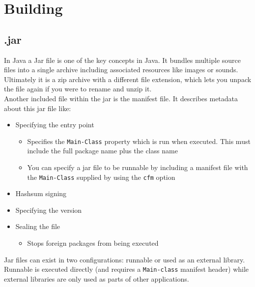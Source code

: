 \documentclass{article}
\begin{document}
	\section{Building}
	\subsection{.jar}
	In Java a Jar file is one of the key concepts in Java. It bundles multiple source files into a single archive including associated resources like images or sounds. Ultimately it is a zip archive with a different file extension, which lets you unpack the file again if you were to rename and unzip it. \\
	Another included file within the jar is the manifest file. It describes metadata about this jar file like:
	\begin{itemize}
		\item{Specifying the entry point}
		\begin{itemize}
			\item{Specifies the \texttt{Main-Class} property which is run when executed. This must include the full package name plus the class name}
			\item{You can specify a jar file to be runnable by including a manifest file with the \texttt{Main-Class} supplied by using the \texttt{cfm} option}
		\end{itemize}
		\item{Hashsum signing}
		\item{Specifying the version}
		\item{Sealing the file}
		\begin{itemize}
			\item{Stops foreign packages from being executed}
		\end{itemize}
	\end{itemize}
	Jar files can exist in two configurations: runnable or used as an external library. Runnable is executed directly (and requires a \texttt{Main-class} manifest header) while external libraries are only used as parts of other applications.
\end{document}
